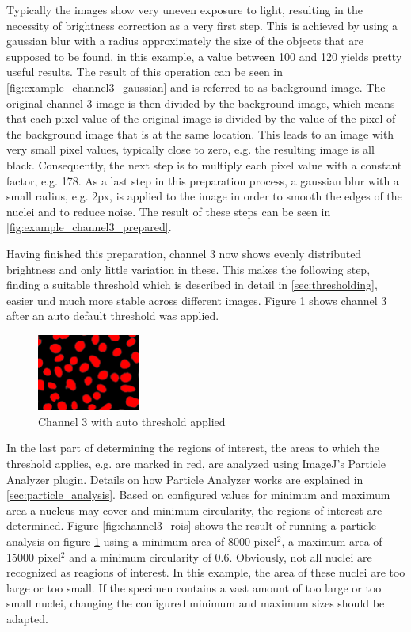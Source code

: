 \documentclass[a4paper, 11pt]{article}
\begin{document}
Typically the images show very uneven exposure to light, resulting in the
necessity of brightness correction as a very first step. This is achieved by
using a gaussian blur with a radius approximately the size of the objects that
are supposed to be found, in this example, a value between 100 and 120 yields
pretty useful results. The result of this operation can be seen in
\ref{fig:example_channel3_gaussian} and is referred to as background image. The
original channel 3 image is then divided by the background image, which means
that each pixel value of the original image is divided by the value of the pixel
of the background image that is at the same location. 
This leads to an image with very small pixel values, typically close to zero,
e.g. the resulting image is all black. Consequently, the next step is to
multiply each pixel value with a constant factor, e.g. 178. As a last step in
this preparation process, a gaussian blur with a small radius, e.g. 2px, is
applied to the image in order to smooth the edges of the nuclei and to reduce
noise. The result of these steps can be seen in \ref{fig:example_channel3_prepared}.

Having finished this preparation, channel 3 now shows evenly distributed
brightness and only little variation in these. This makes the following step,
finding a suitable threshold which is described in detail in
\ref{sec:thresholding}, easier und much more stable across different images.
Figure \ref{fig:channel3_threshold} shows channel 3 after an auto
default threshold was applied.

\begin{figure}
\vspace{-12pt}
\includegraphics[width=0.3\textwidth]{images/example_Kanal3_corrected_threshold}
\caption{Channel 3 with auto threshold applied}
\label{fig:channel3_threshold}
\end{figure}

In the last part of determining the regions of interest, the areas to which the
threshold applies, e.g. are marked in red, are analyzed using ImageJ's
Particle Analyzer plugin. Details on how Particle Analyzer works are explained
in \ref{sec:particle_analysis}. Based on configured values for minimum and
maximum area a nucleus may cover and minimum circularity, the regions of
interest are determined. Figure \ref{fig:channel3_rois} shows the result of
running a particle analysis on figure \ref{fig:channel3_threshold} using a
minimum area of 8000 pixel$^2$, a maximum area of 15000 pixel$^2$ and a minimum
circularity of 0.6. Obviously, not all nuclei are recognized as reagions of
interest. In this example, the area of these nuclei are too large or too small.
If the specimen contains a vast amount of too large or too small nuclei,
changing the configured minimum and maximum sizes should be adapted. 
\end{document}
